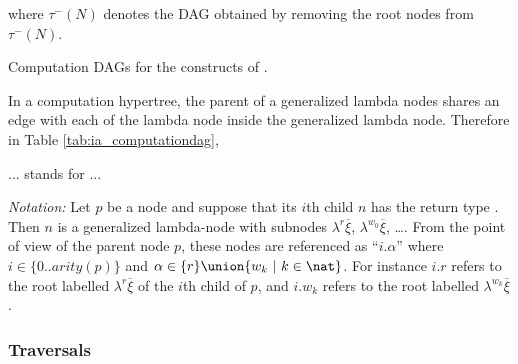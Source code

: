 \begin{table}
\begin{center}
where $\tau^-(N)$ denotes the DAG obtained by removing the root nodes from $\tau^-(N)$.
\end{center}
  \caption{Computation DAGs for the constructs of \ialgol.}
  \label{tab:ia_computationdag}
\end{table}

In a computation hypertree, the parent of a generalized lambda nodes shares an edge with each of the lambda node inside the generalized lambda node. Therefore in Table \ref{tab:ia_computationdag},

... stands for ...



\emph{Notation:} Let $p$ be a node and suppose that its $i$th child $n$ has the
return type \iavar. Then $n$ is a generalized lambda-node with subnodes
$\lambda^r \overline{\xi}$, $\lambda^{w_0}
\overline{\xi}$, \ldots. From the point of view of the parent node $p$, these nodes are referenced as ``$i.\alpha$'' where $i\in\{0..arity(p)\}$ and $\alpha \in \{ r\} \union\{ w_k \ | \ k \in \nat \}$. For instance  $i.r$ refers to the root labelled $\lambda^r \overline{\xi}$ of the $i$th child of $p$, and
$i.w_k$ refers to the root labelled $\lambda^{w_k} \overline{\xi}$.




\subsubsection{Traversals}


